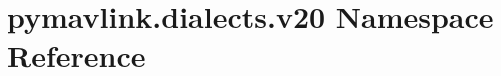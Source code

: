 \hypertarget{namespacepymavlink_1_1dialects_1_1v20}{}\section{pymavlink.\+dialects.\+v20 Namespace Reference}
\label{namespacepymavlink_1_1dialects_1_1v20}
